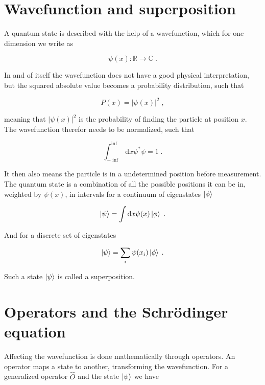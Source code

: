 \section{Wavefunction and superposition}

A quantum state is described with the help of a wavefunction, which for one dimension we write as

$$\psi(x): \mathbb{R}\rightarrow\mathbb{C} \; .$$

In and of itself the wavefunction does not have a good physical interpretation, but the squared absolute value becomes a probability distribution, such that

\begin{equation}
    P(x) = |\psi(x)|^2 \; ,
\end{equation}

meaning that $|\psi(x)|^2$ is the probability of finding the particle at position $x$. The wavefunction therefor needs to be normalized, such that 

\begin{equation}
    \int_{-\inf}^{\inf}\mathrm{d}x \psi^*\psi = 1 \; .
\end{equation}

It then also means the particle is in a undetermined position before measurement. The quantum state is a combination of all the possible positions it can be in, weighted by $\psi(x)$, in intervals for a continuum of eigenstates $\ket{\phi}$ 

\begin{equation}
    \ket{\psi} = \int\mathrm{d}x \psi(x)\ket{\phi} \; .
\end{equation}

And for a discrete set of eigenstates

\begin{equation}
    \ket{\psi} = \sum_i \psi(x_i)\ket{\phi} \; .
\end{equation}

Such a state $\ket{\psi}$ is called a superposition.

\section{Operators and the Schrödinger equation}

Affecting the wavefunction is done mathematically through operators. An operator maps a state to another, transforming the wavefunction. For a generalized operator $\hat{O}$ and the state $\ket{\psi}$ we have

